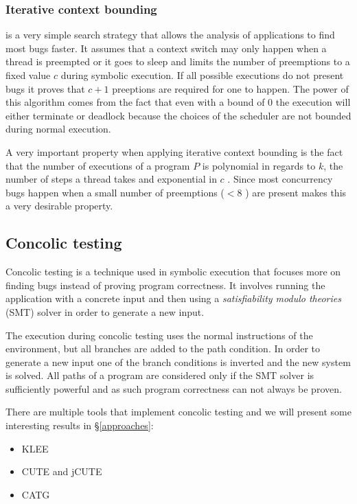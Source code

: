 \documentclass[10pt]{llncs}
\begin{document}
\subsubsection{Iterative context bounding}

is a very simple search strategy that allows the analysis of applications to find most bugs faster. It assumes that a context switch may only happen when a thread is preempted or it goes to sleep and limits the number of preemptions to a fixed value $c$ during symbolic execution. If all possible executions do not present bugs it proves that $c+1$ preeptions are required for one to happen. The power of this algorithm comes from the fact that even with a bound of 0 the execution will either terminate or deadlock because the choices of the scheduler are not bounded during normal execution. 

A very important property when applying iterative context bounding is the fact that the number of executions of a program $P$ is polynomial in regards to $k$, the number of steps a thread takes and exponential in $c$ \cite{iterativecontextbound}. Since most concurrency bugs happen when a small number of preemptions ($ < 8$ \cite[§4.1]{iterativecontextbound}) are present makes this a very desirable property.

\subsection{Concolic testing}

Concolic testing is a technique used in symbolic execution that focuses more on finding bugs instead of proving program correctness. It involves running the application with a concrete input and then using a \emph{satisfiability modulo theories} (SMT) solver in order to generate a new input.

The execution during concolic testing uses the normal instructions of the environment, but all branches are added to the path condition. In order to generate a new input one of the branch conditions is inverted and the new system is solved. All paths of a program are considered only if the SMT solver is sufficiently powerful and as such program correctness can not always be proven.

There are multiple tools that implement concolic testing and we will present some interesting results in §\ref{approaches}:

\begin{itemize}
	\item KLEE \cite{klee}
	\item CUTE and jCUTE \cite{base4}
	\item CATG
\end{itemize}
\end{document}
